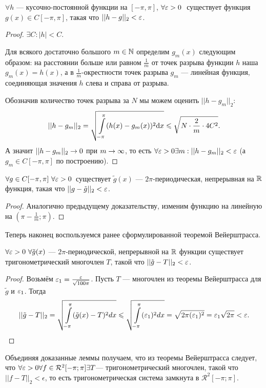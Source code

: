 \begin{Lemma}
    $\forall h$ --- кусочно-постоянной функции на $[-\pi, \pi]$, $ \forall \varepsilon > 0\  $ существует функция $ g(x)\in C[-\pi, \pi]$, такая что $||h-g||_2 < \varepsilon$.
\end{Lemma}
\begin{proof}
    $\exists C: |h| < C.$
    
    Для всякого достаточно большого $m \in \mathbb{N}$ определим $g_m(x)$ следующим образом: на расстоянии больше или равном $\frac{1}{m}$ от точек разрыва функции $h$ наша $g_m(x) = h(x)$, а в  $\frac{1}{m}$-окрестности точек разрыва $g_m$ --- линейная функция, соединяющая значения $h$ слева и справа от разрыва.
    
    Обозначив количество точек разрыва за $N$ мы можем оценить $||h-g_m||_2$:
   $$ ||h-g_m||_2 = \sqrt{\int\limits_{-\pi}^{\pi}(h(x)-g_m(x))^2\mathrm{d}x}\leqslant\sqrt{N\cdot\frac{2}{m}\cdot4C^2 } .$$
   А значит $||h-g_m||_2\rightarrow0$ при $m \rightarrow \infty$, то есть $\forall \varepsilon>0 \exists m: ||h-g_m||_2 < \varepsilon$ (а $g_m \in C[-\pi, \pi]$ по построению).
\end{proof}


\begin{Lemma}
    $\forall g \in C[-\pi, \pi]\ \forall \varepsilon > 0$\ существует $\tilde{g}(x)$ --- $2\pi$-периодическая, непрерывная на $\mathbb{R}$ функция, такая что $||g-\tilde{g}||_2 < \varepsilon$.
\end{Lemma}
\begin{proof}
    Аналогично предыдущему доказательству, изменим функцию на линейную на $(\pi- \frac{1}{m}; \pi)$.
\end{proof}
Теперь наконец воспользуемся ранее сформулированной теоремой Вейерштрасса.
\begin{Lemma}
    $\forall \eps > 0\ \forall\tilde{g}(x)$ --- $2\pi$-периодической, непрерывной на $\mathbb{R}$ функции существует тригонометрический многочлен $T$, такой что $||\tilde{g}-T||_2 < \varepsilon$.
\end{Lemma}
\begin{proof}
   Возьмём $\varepsilon_1 = \frac{\varepsilon}{\sqrt{100\pi}}$.
   Пусть $T$ --- многочлен из теоремы Вейерштрасса для $\tilde{g}$ и $\varepsilon_1$.
   Тогда $$||\tilde{g}-T||_2=\sqrt{\int\limits_{-\pi}^{\pi}(\tilde{g}(x)-T)^2dx}\leqslant \sqrt{\int\limits_{-\pi}^{\pi}(\varepsilon_1)^2dx} = \sqrt{2\pi(\varepsilon_1)^2}=\varepsilon_1\sqrt{2\pi} < \varepsilon.$$
\end{proof}
Объединяя доказанные леммы получаем, что из теоремы Вейерштрасса следует, что $\forall \varepsilon >0 \forall f \in \mathcal{R}^2[-\pi;\pi] \exists T$--- тригонометрический многочлен, такой что $||f-T||_2 < \epsilon$, то есть тригонометрическая система замкнута в $ \mathcal{R}^2[-\pi;\pi]$.

